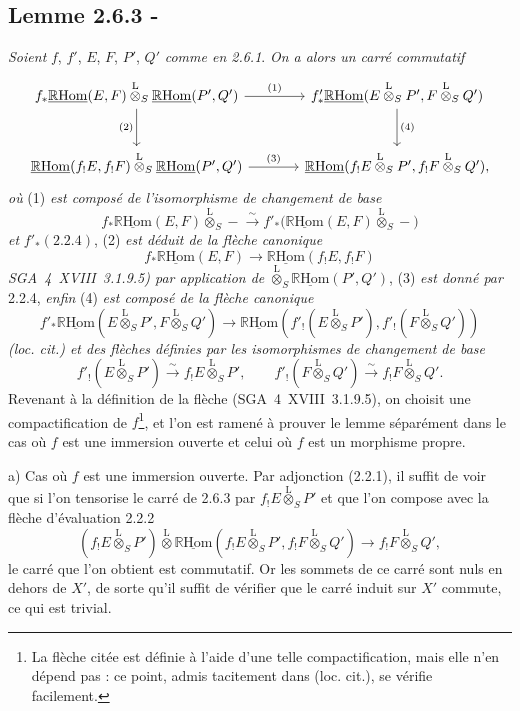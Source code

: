 \documentclass[11pt]{article}
\newcommand{\R}{\mathbb{R}}\newcommand{\RHomCore}{\mathbb{R}\mathrm{Hom}}
\providecommand{\RHom}{\RHomCore}
\providecommand{\uRHom}{\underline{\RHom}}
\providecommand{\RHom}{\RHomCore}
\providecommand{\RHom}{\R\mathcal{H}om}
\providecommand{\R}{\mathrm R}
\providecommand{\RHom}{\RHomCore}
\begin{document}
\subsection*{Lemme 2.6.3 -}
\emph{Soient} $f$, $f'$, $E$, $F$, $P'$, $Q'$ \emph{comme en 2.6.1}. \emph{On a alors un carré commutatif}
\[
\begin{tikzcd}[column sep=large,row sep=large]
f_*\uRHom(E,F)\overset{\mathrm{L}}{\otimes}_S\uRHom(P',Q') \arrow[r,"(1)"] \arrow[d,"(2)"'] & f'_*\uRHom(E\overset{\mathrm{L}}{\otimes}_SP',F\overset{\mathrm{L}}{\otimes}_SQ') \arrow[d,"(4)"]\\
\uRHom(f_!E,f_!F)\overset{\mathrm{L}}{\otimes}_S\uRHom(P',Q') \arrow[r,"(3)"] & \uRHom(f_!E\overset{\mathrm{L}}{\otimes}_SP',f_!F\overset{\mathrm{L}}{\otimes}_SQ'),
\end{tikzcd}
\]
\emph{où} (1) \emph{est composé de l'isomorphisme de changement de base}
\[
f_*\uRHom(E,F)\overset{\mathrm{L}}{\otimes}_S -\xrightarrow{\sim}f'_*\bigl(\uRHom(E,F)\overset{\mathrm{L}}{\otimes}_S-\bigr)
\]
\emph{et} $f'_*(2.2.4)$, (2) \emph{est déduit de la flèche canonique}
\[
f_*\uRHom(E,F)\longrightarrow\uRHom(f_!E,f_!F)
\]
\emph{SGA~4~XVIII~3.1.9.5) par application de} $\overset{\mathrm{L}}{\otimes}_S\uRHom(P',Q')$, (3) \emph{est donné par} 2.2.4, \emph{enfin} (4) \emph{est composé de la flèche canonique}
\[
f'_*\uRHom(E\overset{\mathrm{L}}{\otimes}_SP',F\overset{\mathrm{L}}{\otimes}_SQ')
\longrightarrow
\uRHom(f'_!(E\overset{\mathrm{L}}{\otimes}_SP'),f'_!(F\overset{\mathrm{L}}{\otimes}_SQ'))
\]
\emph{(loc. cit.) et des flèches définies par les isomorphismes de changement de base}
\[
f'_!(E\overset{\mathrm{L}}{\otimes}_SP')\xrightarrow{\sim}f_!E\overset{\mathrm{L}}{\otimes}_SP',
\qquad
f'_!(F\overset{\mathrm{L}}{\otimes}_SQ')\xrightarrow{\sim}f_!F\overset{\mathrm{L}}{\otimes}_SQ'.
\]
Revenant à la définition de la flèche (SGA~4~XVIII~3.1.9.5), on choisit une compactification de $f$\footnote{La flèche citée est définie à l'aide d'une telle compactification, mais elle n'en dépend pas : ce point, admis tacitement dans (loc. cit.), se vérifie facilement.}, et l'on est ramené à prouver le lemme séparément dans le cas où $f$ est une immersion ouverte et celui où $f$ est un morphisme propre.

a) Cas où $f$ est une immersion ouverte. Par adjonction (2.2.1), il suffit de voir que si l'on tensorise le carré de 2.6.3 par $f_!E\overset{\mathrm{L}}{\otimes}_SP'$ et que l'on compose avec la flèche d'évaluation 2.2.2
\[
(f_!E\overset{\mathrm{L}}{\otimes}_SP')\overset{\mathrm{L}}{\otimes}\uRHom(f_!E\overset{\mathrm{L}}{\otimes}_SP',f_!F\overset{\mathrm{L}}{\otimes}_SQ')\longrightarrow f_!F\overset{\mathrm{L}}{\otimes}_SQ',
\]
le carré que l'on obtient est commutatif. Or les sommets de ce carré sont nuls en
dehors de $X'$, de sorte qu'il suffit de vérifier que le carré induit sur $X'$ commute, ce qui est trivial.
\end{document}
